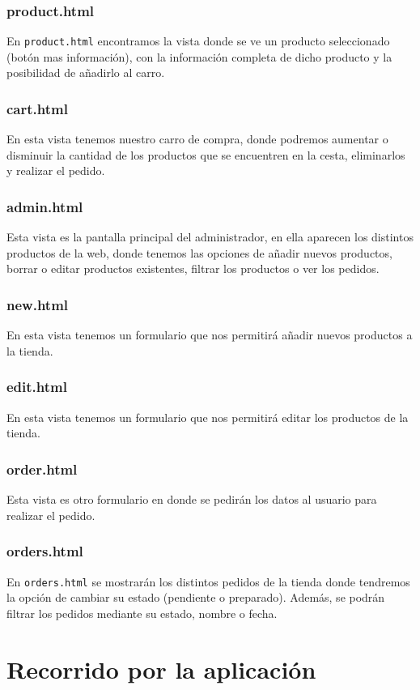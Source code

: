 \documentclass[10pt,a4paper,svgnames]{article}
\begin{document}
\subsubsection{product.html}
En \texttt{product.html} encontramos la vista donde se ve un producto seleccionado (botón mas información), con la información completa de dicho producto y la posibilidad de añadirlo al carro.
\subsubsection{cart.html}
En esta vista tenemos nuestro carro de compra, donde podremos aumentar o disminuir la cantidad de los productos que se encuentren en la cesta, eliminarlos y realizar el pedido.
\subsubsection{admin.html}
Esta vista es la pantalla principal del administrador, en ella aparecen los distintos productos de la web, donde tenemos las opciones de añadir nuevos productos, borrar o editar productos existentes, filtrar los productos o ver los pedidos.
\subsubsection{new.html}
En esta vista tenemos un formulario que nos permitirá añadir nuevos productos a la tienda.
\subsubsection{edit.html}
En esta vista tenemos un formulario que nos permitirá editar los productos de la tienda.
\subsubsection{order.html}
Esta vista es otro formulario en donde se pedirán los datos al usuario para realizar el pedido.
\subsubsection{orders.html}
En \texttt{orders.html} se mostrarán los distintos pedidos de la tienda donde tendremos la opción de cambiar su estado (pendiente o preparado). Además, se podrán filtrar los pedidos mediante su estado, nombre o fecha.
\section{Recorrido por la aplicación}
\end{document}
